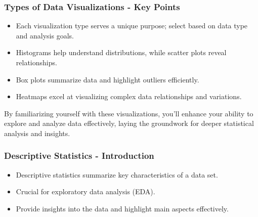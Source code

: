 \documentclass[aspectratio=169]{beamer}
\begin{document}
\begin{frame}[fragile]
    \frametitle{Types of Data Visualizations - Key Points}
    \begin{itemize}
        \item Each visualization type serves a unique purpose; select based on data type and analysis goals.
        \item Histograms help understand distributions, while scatter plots reveal relationships.
        \item Box plots summarize data and highlight outliers efficiently.
        \item Heatmaps excel at visualizing complex data relationships and variations.
    \end{itemize}
    By familiarizing yourself with these visualizations, you'll enhance your ability to explore and analyze data effectively, laying the groundwork for deeper statistical analysis and insights.
\end{frame}

\begin{frame}[fragile]
    \frametitle{Descriptive Statistics - Introduction}
    \begin{itemize}
        \item Descriptive statistics summarize key characteristics of a data set.
        \item Crucial for exploratory data analysis (EDA).
        \item Provide insights into the data and highlight main aspects effectively.
    \end{itemize}
\end{frame}
\end{document}
